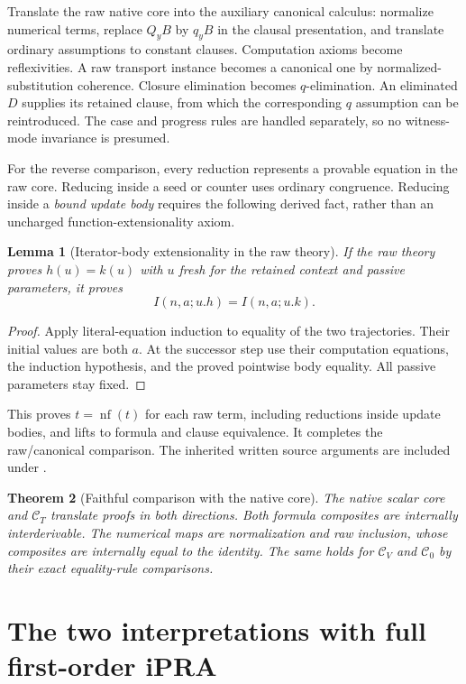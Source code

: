 \documentclass[11pt]{article}
\newtheorem{theorem}{Theorem}[section]
\newtheorem{lemma}[theorem]{Lemma}
\theoremstyle{definition}
\theoremstyle{remark}
\DeclareMathOperator{\nf}{nf}
\newcommand{\CV}{\mathcal C_V}
\newcommand{\CZ}{\mathcal C_0}
\newcommand{\CT}{\mathcal C_T}
\newcommand{\code}[1]{\texttt{\detokenize{#1}}}
\begin{document}
Translate the raw native core into the auxiliary canonical calculus:
normalize numerical terms, replace $Q_yB$ by $q_yB$ in the clausal
presentation, and translate ordinary assumptions to constant clauses.
Computation axioms become reflexivities. A raw transport instance
becomes a canonical one by normalized-substitution coherence.
Closure elimination becomes $q$-elimination.
An eliminated $D$ supplies its retained clause, from which the corresponding
$q$ assumption can be reintroduced. The case and progress rules are handled
separately, so no witness-mode invariance is presumed.

For the reverse comparison, every reduction represents a provable
equation in the raw core. Reducing inside a seed or counter uses ordinary
congruence. Reducing inside a \emph{bound update body} requires the following
derived fact, rather than an uncharged function-extensionality axiom.

\begin{lemma}[Iterator-body extensionality in the raw theory]
If the raw theory proves $h(u)=k(u)$ with $u$ fresh for the retained
context and passive parameters, it proves
\[
 I(n,a;u.h)=I(n,a;u.k).
\]
\end{lemma}
\begin{proof}
Apply literal-equation induction to equality of the two trajectories.
Their initial values are both $a$. At the successor step use their
computation equations, the induction hypothesis, and the proved pointwise
body equality. All passive parameters stay fixed.
\end{proof}

This proves $t=\nf(t)$ for each raw term, including reductions inside
update bodies, and lifts to formula and clause equivalence. It completes the
raw/canonical comparison. The inherited written source arguments are
included under \code{reference/}.

\begin{theorem}[Faithful comparison with the native core]
The native scalar core and $\CT$ translate proofs in both directions.
Both formula composites are internally interderivable. The numerical
maps are normalization and raw inclusion, whose composites are
internally equal to the identity. The same holds for
$\CV$ and $\CZ$ by their exact equality-rule comparisons.
\end{theorem}

\section{The two interpretations with full first-order iPRA}
\label{sec:interpretations}
\end{document}
